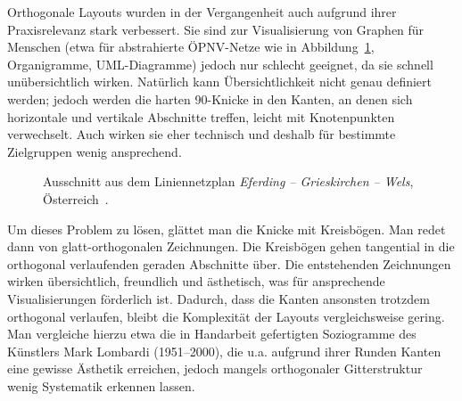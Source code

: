 \documentclass[a4paper]{scrreprt}
\theoremstyle{definition}
\begin{document}
Orthogonale Layouts wurden in der Vergangenheit auch aufgrund ihrer Praxisrelevanz stark verbessert. Sie sind zur Visualisierung von Graphen für Menschen (etwa für abstrahierte ÖPNV-Netze wie in Abbildung~\ref{fig:liniennetzplan}, Organigramme, UML-Diagramme) jedoch nur schlecht geeignet, da sie schnell unübersichtlich wirken. %
Natürlich kann Übersichtlichkeit nicht genau definiert werden; jedoch werden die harten 90\textdegree-Knicke in den Kanten, an denen sich horizontale und vertikale Abschnitte treffen, leicht mit Knotenpunkten verwechselt. Auch wirken sie eher technisch und deshalb für bestimmte Zielgruppen wenig ansprechend.

\begin{figure}[h]
  \centering
  \caption{Ausschnitt aus dem Liniennetzplan \emph{Eferding -- Grieskirchen -- Wels}, Österreich~\cite{waldherr-14}.}
  \label{fig:liniennetzplan}
\end{figure}

Um dieses Problem zu lösen, glättet man die Knicke mit Kreisbögen. Man redet dann von glatt-orthogonalen Zeichnungen. Die Kreisbögen gehen tangential in die orthogonal verlaufenden geraden Abschnitte über. Die entstehenden Zeichnungen wirken übersichtlich, freundlich und ästhetisch, was für ansprechende Visualisierungen förderlich ist. Dadurch, dass die Kanten ansonsten trotzdem orthogonal verlaufen, bleibt die Komplexität der Layouts vergleichsweise gering. Man vergleiche hierzu etwa die in Handarbeit gefertigten Soziogramme des Künstlers Mark Lombardi (1951--2000), die u.a. aufgrund ihrer Runden Kanten eine gewisse Ästhetik erreichen, jedoch mangels orthogonaler Gitterstruktur wenig Systematik erkennen lassen. 
\end{document}
